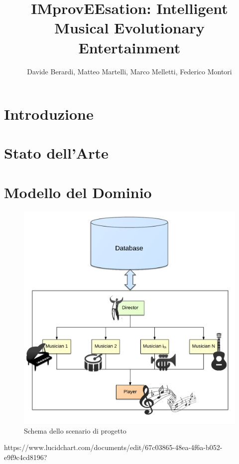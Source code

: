\documentclass[a4paper,10pt]{article}
\title{IMprovEEsation: Intelligent Musical Evolutionary Entertainment}
\author{Davide Berardi, Matteo Martelli, Marco Melletti, Federico Montori}
\begin{document}
\maketitle

\begin{abstract}

\end{abstract}

\section{Introduzione}

\section{Stato dell'Arte}

\section{Modello del Dominio}
\begin{figure}[H]
\centering
\includegraphics[scale=0.30]{model.png}
\caption{Schema dello scenario di progetto}
\end{figure}

https://www.lucidchart.com/documents/edit/67c03865-48ea-4f6a-b052-e9f9c4cd8196?
\end{document}
